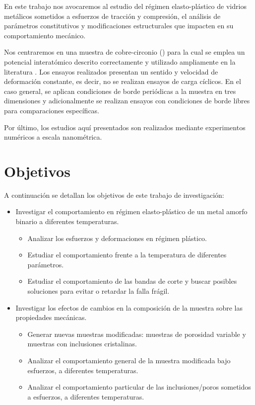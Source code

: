 En este trabajo nos avocaremos al estudio del régimen elasto-plástico de vidrios metálicos sometidos a esfuerzos de tracción y compresión, el análisis de parámetros constitutivos y modificaciones estructurales que impacten en su comportamiento mecánico.

Nos centraremos en una muestra de cobre-circonio (\CuZr) para la cual se emplea un potencial interatómico descrito correctamente \citep{daw84} y utilizado ampliamente en la literatura \citep{shimizu07,cao09,cheng09,arman10,cheng11,wang12}. Los ensayos realizados presentan un sentido y velocidad de deformación constante, es decir, no se realizan ensayos de carga cíclicos. En el caso general, se aplican condiciones de borde periódicas a la muestra en tres dimensiones y adicionalmente se realizan ensayos con condiciones de borde libres para comparaciones específicas.

Por último, los estudios aquí presentados son realizados mediante experimentos numéricos a escala nanométrica.



\section{Objetivos}
\label{S1_4}

A continuación se detallan los objetivos de este trabajo de investigación:

\begin{itemize}
 \item Investigar el comportamiento en régimen elasto-plástico de un metal amorfo binario a diferentes temperaturas.
 \begin{itemize}
  \item Analizar los esfuerzos y deformaciones en régimen plástico.
  \item Estudiar el comportamiento frente a la temperatura de diferentes parámetros.
  \item Estudiar el comportamiento de las bandas de corte y buscar posibles soluciones para evitar o retardar la falla frágil.
 \end{itemize}
 \item Investigar los efectos de cambios en la composición de la muestra sobre las propiedades mecánicas.
 \begin{itemize}
  \item Generar nuevas muestras modificadas: muestras de porosidad variable y muestras con inclusiones cristalinas.
  \item Analizar el comportamiento general de la muestra modificada bajo esfuerzos, a diferentes temperaturas.
  \item Analizar el comportamiento particular de las inclusiones/poros sometidos a esfuerzos, a diferentes temperaturas.
 \end{itemize}
\end{itemize}

